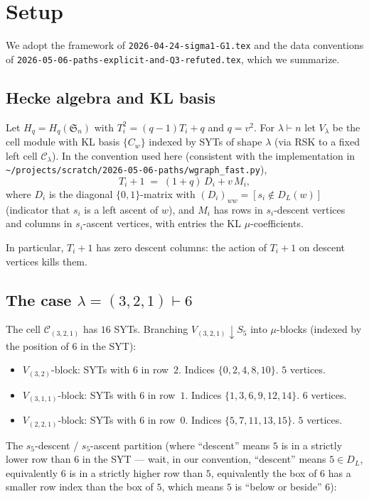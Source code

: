 \documentclass[11pt]{article}
\theoremstyle{definition}
\begin{document}
\section{Setup}

We adopt the framework of \texttt{2026-04-24-sigma1-G1.tex} and the data conventions
of \texttt{2026-05-06-paths-explicit-and-Q3-refuted.tex}, which we summarize.

\subsection*{Hecke algebra and KL basis}

Let $H_q = H_q(\mathfrak{S}_n)$ with $T_i^2 = (q-1)T_i + q$ and $q = v^2$. For
$\lambda \vdash n$ let $V_\lambda$ be the cell module with KL basis $\{C_w\}$
indexed by SYTs of shape $\lambda$ (via RSK to a fixed left cell $\mathcal{C}_\lambda$).
In the convention used here (consistent with the implementation in
\texttt{\textasciitilde/projects/scratch/2026-05-06-paths/wgraph\_fast.py}),
\[
T_i + 1 \;=\; (1+q)\,D_i + v\, M_i,
\]
where $D_i$ is the diagonal $\{0,1\}$-matrix with $(D_i)_{ww} = [s_i \notin D_L(w)]$
(indicator that $s_i$ is a left ascent of $w$), and $M_i$ has rows in $s_i$-descent
vertices and columns in $s_i$-ascent vertices, with entries the KL $\mu$-coefficients.

In particular, $T_i + 1$ has zero descent columns: the action of $T_i+1$ on
descent vertices kills them.

\subsection*{The case $\lambda = (3,2,1) \vdash 6$}

The cell $\mathcal{C}_{(3,2,1)}$ has $16$ SYTs. Branching $V_{(3,2,1)} \downarrow S_5$
into $\mu$-blocks (indexed by the position of $6$ in the SYT):
\begin{itemize}[leftmargin=2em,topsep=0.2em,itemsep=0.1em]
\item $V_{(3,2)}$-block: SYTs with $6$ in row~$2$. Indices $\{0, 2, 4, 8, 10\}$. $5$ vertices.
\item $V_{(3,1,1)}$-block: SYTs with $6$ in row~$1$. Indices $\{1, 3, 6, 9, 12, 14\}$. $6$ vertices.
\item $V_{(2,2,1)}$-block: SYTs with $6$ in row~$0$. Indices $\{5, 7, 11, 13, 15\}$. $5$ vertices.
\end{itemize}

The $s_5$-descent / $s_5$-ascent partition (where ``descent'' means $5$ is in a
strictly lower row than $6$ in the SYT — wait, in our convention, ``descent'' means
$5 \in D_L$, equivalently $6$ is in a strictly higher row than $5$, equivalently
the box of $6$ has a smaller row index than the box of $5$, which means $5$ is
``below or beside'' $6$):
\end{document}
